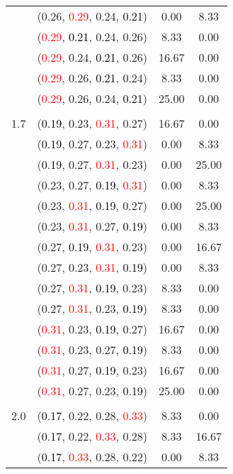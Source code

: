 \documentclass[10pt,a4paper]{report}
\begin{document}
\begin{center}
\begin{longtable}{clcc}
			&(0.26, \textcolor{red}{0.29}, 0.24, \textcolor{black}{0.21})&0.00&8.33\\
			&(\textcolor{red}{0.29}, \textcolor{black}{0.21}, 0.24, 0.26)&8.33&0.00\\
			&(\textcolor{red}{0.29}, 0.24, \textcolor{black}{0.21}, 0.26)&16.67&0.00\\
			&(\textcolor{red}{0.29}, 0.26, \textcolor{black}{0.21}, 0.24)&8.33&0.00\\
			&(\textcolor{red}{0.29}, 0.26, 0.24, \textcolor{black}{0.21})&25.00&0.00\\
		&&&\\
		1.7			&(\textcolor{black}{0.19}, 0.23, \textcolor{red}{0.31}, 0.27)&16.67&0.00\\
			&(\textcolor{black}{0.19}, 0.27, 0.23, \textcolor{red}{0.31})&0.00&8.33\\
			&(\textcolor{black}{0.19}, 0.27, \textcolor{red}{0.31}, 0.23)&0.00&25.00\\
			&(0.23, 0.27, \textcolor{black}{0.19}, \textcolor{red}{0.31})&0.00&8.33\\
			&(0.23, \textcolor{red}{0.31}, \textcolor{black}{0.19}, 0.27)&0.00&25.00\\
			&(0.23, \textcolor{red}{0.31}, 0.27, \textcolor{black}{0.19})&0.00&8.33\\
			&(0.27, \textcolor{black}{0.19}, \textcolor{red}{0.31}, 0.23)&0.00&16.67\\
			&(0.27, 0.23, \textcolor{red}{0.31}, \textcolor{black}{0.19})&0.00&8.33\\
			&(0.27, \textcolor{red}{0.31}, \textcolor{black}{0.19}, 0.23)&8.33&0.00\\
			&(0.27, \textcolor{red}{0.31}, 0.23, \textcolor{black}{0.19})&8.33&0.00\\
			&(\textcolor{red}{0.31}, 0.23, \textcolor{black}{0.19}, 0.27)&16.67&0.00\\
			&(\textcolor{red}{0.31}, 0.23, 0.27, \textcolor{black}{0.19})&8.33&0.00\\
			&(\textcolor{red}{0.31}, 0.27, \textcolor{black}{0.19}, 0.23)&16.67&0.00\\
			&(\textcolor{red}{0.31}, 0.27, 0.23, \textcolor{black}{0.19})&25.00&0.00\\
		&&&\\
		2.0			&(\textcolor{black}{0.17}, 0.22, 0.28, \textcolor{red}{0.33})&8.33&0.00\\
			&(\textcolor{black}{0.17}, 0.22, \textcolor{red}{0.33}, 0.28)&8.33&16.67\\
			&(\textcolor{black}{0.17}, \textcolor{red}{0.33}, 0.28, 0.22)&0.00&8.33\\

\end{longtable}
\end{center}
\end{document}
